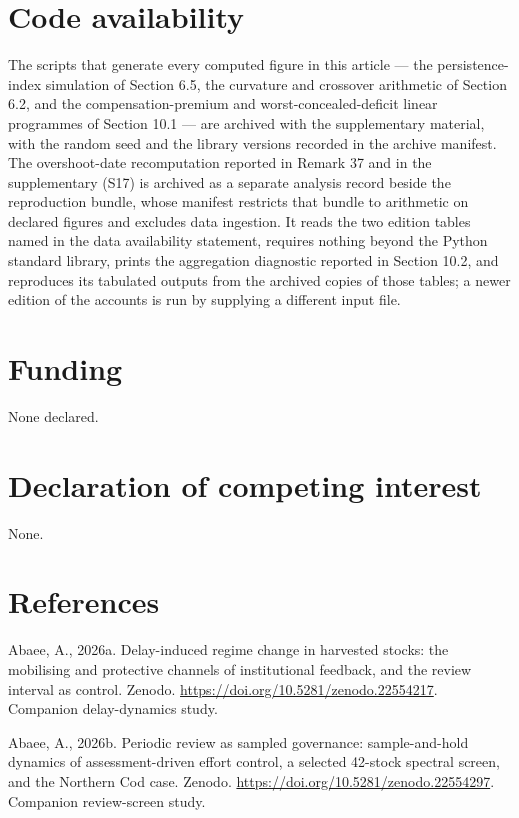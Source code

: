 \documentclass[11pt]{article}
\begin{document}
\section*{Code availability}\label{code-availability}

The scripts that generate every computed figure in this article --- the persistence-index simulation of Section 6.5, the curvature and crossover arithmetic of Section 6.2, and the compensation-premium and worst-concealed-deficit linear programmes of Section 10.1 --- are archived with the supplementary material, with the random seed and the library versions recorded in the archive manifest. The overshoot-date recomputation reported in Remark 37 and in the supplementary (S17) is archived as a separate analysis record beside the reproduction bundle, whose manifest restricts that bundle to arithmetic on declared figures and excludes data ingestion. It reads the two edition tables named in the data availability statement, requires nothing beyond the Python standard library, prints the aggregation diagnostic reported in Section 10.2, and reproduces its tabulated outputs from the archived copies of those tables; a newer edition of the accounts is run by supplying a different input file.

\section*{Funding}\label{funding}

None declared.

\section*{Declaration of competing interest}\label{declaration-of-competing-interest}

None.

\vspace{0.8em}

\section*{References}\label{references}

Abaee, A., 2026a. Delay-induced regime change in harvested stocks: the mobilising and protective channels of institutional feedback, and the review interval as control. Zenodo. \url{https://doi.org/10.5281/zenodo.22554217}. Companion delay-dynamics study.

Abaee, A., 2026b. Periodic review as sampled governance: sample-and-hold dynamics of assessment-driven effort control, a selected 42-stock spectral screen, and the Northern Cod case. Zenodo. \url{https://doi.org/10.5281/zenodo.22554297}. Companion review-screen study.
\end{document}

